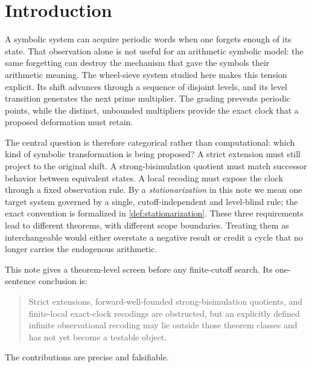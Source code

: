 \section{Introduction}
\label{sec:introduction}

A symbolic system can acquire periodic words when one forgets enough of its
state.  That observation alone is not useful for an arithmetic symbolic
model: the same forgetting can destroy the mechanism that gave the symbols
their arithmetic meaning.  The wheel-sieve system studied here makes this
tension explicit.  Its shift advances through a sequence of disjoint levels,
and its level transition generates the next prime multiplier.  The grading
prevents periodic points, while the distinct, unbounded multipliers provide
the exact clock that a proposed deformation must retain.

The central question is therefore categorical rather than computational:
which kind of symbolic transformation is being proposed?  A strict extension
must still project to the original shift.  A strong-bisimulation quotient
must match successor behavior between equivalent states.  A local recoding
must expose the clock through a fixed observation rule.  By a
\emph{stationarization} in this note we mean one target system governed by a
single, cutoff-independent and level-blind rule; the exact convention is
formalized in \cref{def:stationarization}.  These three
requirements lead to different theorems, with different scope boundaries.
Treating them as interchangeable would either overstate a negative result or
credit a cycle that no longer carries the endogenous arithmetic.

This note gives a theorem-level screen before any finite-cutoff search.  Its
one-sentence conclusion is:

\begin{quote}
Strict extensions, forward-well-founded strong-bisimulation quotients, and
finite-local exact-clock recodings are obstructed, but an explicitly defined
infinite observational recoding may lie outside those theorem classes and
has not yet become a testable object.
\end{quote}

The contributions are precise and falsifiable.

